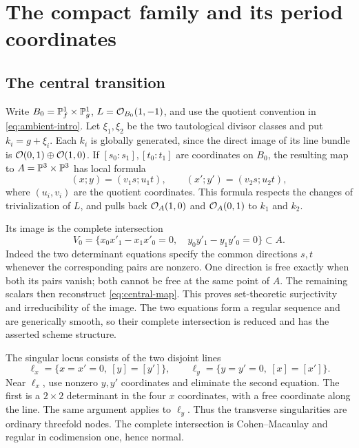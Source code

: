 \section{The compact family and its period coordinates}\label{sec:geometry}

\subsection{The central transition}

Write $B_0=\mathbb P^1_f\times\mathbb P^1_g$, $L=\mathcal O_{B_0}(1,-1)$, and
use the quotient convention in \eqref{eq:ambient-intro}. Let
$\xi_1,\xi_2$ be the two tautological divisor classes and put
$k_i=g+\xi_i$. Each $k_i$ is globally generated, since the direct
image of its line bundle is $\mathcal O(0,1)\oplus\mathcal O(1,0)$.
If $[s_0:s_1],[t_0:t_1]$ are coordinates on $B_0$, the resulting
map to $A=\mathbb P^3\times\mathbb P^3$ has local formula
\begin{equation}\label{eq:central-map}
 (x;y)=(v_1s;u_1t),\qquad
 (x';y')=(v_2s;u_2t),
\end{equation}
where $(u_i,v_i)$ are the quotient coordinates. This formula respects
the changes of trivialization of $L$, and pulls back $\mathcal O_A(1,0)$
and $\mathcal O_A(0,1)$ to $k_1$ and $k_2$.

Its image is the complete intersection
\begin{equation}\label{eq:central-fourfold}
 V_0=\{x_0x'_1-x_1x'_0=0,\quad
         y_0y'_1-y_1y'_0=0\}\subset A.
\end{equation}
Indeed the two determinant equations specify the common directions
$s,t$ whenever the corresponding pairs are nonzero. One direction is
free exactly when both its pairs vanish; both cannot be free at the
same point of $A$. The remaining scalars then reconstruct
\eqref{eq:central-map}. This proves set-theoretic surjectivity and
irreducibility of the image. The two equations form a regular sequence
and are generically smooth, so their complete intersection is reduced
and has the asserted scheme structure.

The singular locus consists of the two disjoint lines
\begin{equation}\label{eq:singular-lines}
 \ell_x=\{x=x'=0,\ [y]=[y']\},\qquad
 \ell_y=\{y=y'=0,\ [x]=[x']\}.
\end{equation}
Near $\ell_x$, use nonzero $y,y'$ coordinates and eliminate the
second equation. The first is a $2\times2$ determinant in the four
$x$ coordinates, with a free coordinate along the line. The same
argument applies to $\ell_y$. Thus the transverse singularities are
ordinary threefold nodes. The complete intersection is Cohen--Macaulay
and regular in codimension one, hence normal.

